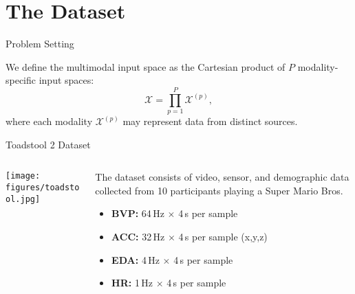 \section{The Dataset}

\begin{frame}{Problem Setting}
	\begin{block}{}
		We define the multimodal input space as the Cartesian product of $P$ modality-specific input spaces:
		\[
		\mathcal{X} = \prod_{p=1}^{P} \mathcal{X}^{(p)},
		\]
		where each modality $\mathcal{X}^{(p)}$ may represent data from distinct sources.
	\end{block}
	
\end{frame}



\begin{frame}{Toadstool 2 Dataset}
		\begin{columns}[T] %
		\begin{column}{0.45\textwidth}
			\texttt{[image: figures/toadstool.jpg]}
			
		\end{column}
		\begin{column}{0.55\textwidth}
			\begin{block}{}
				The dataset consists of video, sensor, and demographic data collected from 10 participants playing a Super Mario Bros.
			\end{block}

		
		\begin{itemize}
			\item \textbf{BVP:} 64\,Hz $\times$ 4\,s per sample
			\item \textbf{ACC:} 32\,Hz $\times$ 4\,s per sample (x,y,z)
			\item \textbf{EDA:} 4\,Hz $\times$ 4\,s per sample
			\item \textbf{HR:} 1\,Hz $\times$ 4\,s per sample
	
		\end{itemize} 


		\end{column}
	\end{columns}
\end{frame}


